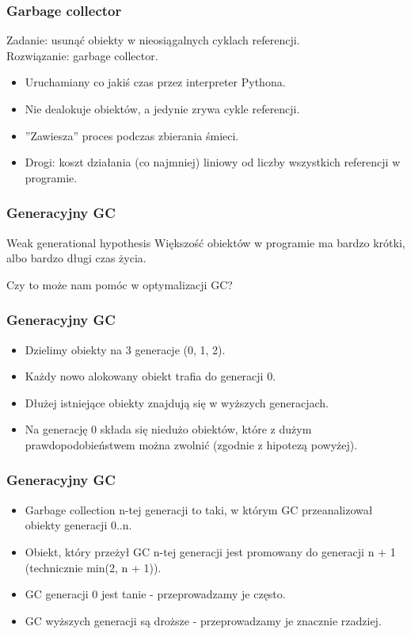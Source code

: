 \documentclass{beamer}
\begin{document}
    \begin{frame}
        \frametitle{Garbage collector}
        Zadanie: usunąć obiekty w nieosiągalnych cyklach referencji.\\
        Rozwiązanie: garbage collector.
        \begin{itemize}
            \item Uruchamiany co jakiś czas przez interpreter Pythona.
            \item Nie dealokuje obiektów, a jedynie zrywa cykle referencji.
            \item ''Zawiesza'' proces podczas zbierania śmieci.
            \item Drogi: koszt działania (co najmniej) liniowy od liczby wszystkich referencji w programie.
        \end{itemize}
    \end{frame}

    \begin{frame}
        \frametitle{Generacyjny GC}
        \begin{block}{Weak generational hypothesis}
            Większość obiektów w programie ma bardzo krótki, albo bardzo długi czas życia.
        \end{block}
        \vfill
        \begin{center}
            Czy to może nam pomóc w optymalizacji GC?
        \end{center}
    \end{frame}

    \begin{frame}
        \frametitle{Generacyjny GC}
        \begin{itemize}
            \item Dzielimy obiekty na 3 generacje (0, 1, 2).
            \item Każdy nowo alokowany obiekt trafia do generacji 0.
            \item Dłużej istniejące obiekty znajdują się w wyższych generacjach.
            \item Na generację 0 składa się niedużo obiektów, które z dużym prawdopodobieństwem można zwolnić (zgodnie z hipotezą powyżej).
        \end{itemize}
    \end{frame}

    \begin{frame}
        \frametitle{Generacyjny GC}
        \begin{itemize}
            \item Garbage collection n-tej generacji to taki, w którym GC przeanalizował obiekty generacji 0..n.
            \item Obiekt, który przeżył GC n-tej generacji jest promowany do generacji n + 1 (technicznie min(2, n + 1)).
            \item GC generacji 0 jest tanie - przeprowadzamy je często.
            \item GC wyższych generacji są droższe - przeprowadzamy je znacznie rzadziej.
        \end{itemize}
    \end{frame}
\end{document}
